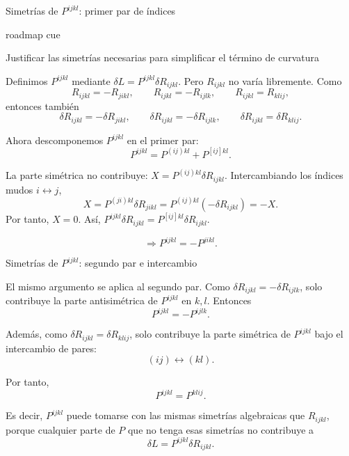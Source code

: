 \documentclass{beamer}
\newcommand{\DenseDisplaySpacing}{%
\setlength{\abovedisplayskip}{1pt}%
\setlength{\belowdisplayskip}{1pt}%
\setlength{\abovedisplayshortskip}{0pt}%
\setlength{\belowdisplayshortskip}{0pt}%
\setlength{\jot}{1pt}%
}
\newcommand{\RoadmapCue}[1]{%
    \begin{beamercolorbox}[
        wd=\textwidth,
        sep=.55ex,
        leftskip=.8ex,
        rounded=true
    ]{roadmap cue}

    \scriptsize
    \enspace #1

    \end{beamercolorbox}

    \vspace{.25em}
}
\begin{document}
\begin{frame}[label=nav-frame-011]{Simetrías de \(P^{ijkl}\): primer par de índices}
\RoadmapCue{
Justificar las simetrías necesarias para simplificar
el término de curvatura
}
\small
\linespread{.94}\selectfont\DenseDisplaySpacing
Definimos \(P^{ijkl}\) mediante $\delta L=P^{ijkl}\delta R_{ijkl}$. Pero \(R_{ijkl}\) no varía libremente. Como
\[
R_{ijkl}=-R_{jikl},\qquad
R_{ijkl}=-R_{ijlk},\qquad
R_{ijkl}=R_{klij},
\]
entonces también
\[
\delta R_{ijkl}=-\delta R_{jikl},\qquad
\delta R_{ijkl}=-\delta R_{ijlk},\qquad
\delta R_{ijkl}=\delta R_{klij}.
\]

Ahora descomponemos \(P^{ijkl}\) en el primer par:
\[
P^{ijkl}=P^{(ij)kl}+P^{[ij]kl}.
\]

La parte simétrica no contribuye: $X=P^{(ij)kl}\delta R_{ijkl}$. Intercambiando los índices mudos \(i\leftrightarrow j\),
\[
X=P^{(ji)kl}\delta R_{jikl}
  =P^{(ij)kl}(-\delta R_{ijkl})
  =-X.
\]
Por tanto, $X=0$. Así, $P^{ijkl}\delta R_{ijkl} = P^{[ij]kl}\delta R_{ijkl}$.

\[
\Rightarrow \boxed{P^{ijkl}=-P^{jikl}}.
\]

\end{frame}

\begin{frame}[label=nav-frame-012]{Simetrías de \(P^{ijkl}\): segundo par e intercambio}

El mismo argumento se aplica al segundo par. Como $\delta R_{ijkl}=-\delta R_{ijlk}$, solo contribuye la parte antisimétrica de \(P^{ijkl}\) en \(k,l\). Entonces
\[
\boxed{P^{ijkl}=-P^{ijlk}}.
\]

Además, como $\delta R_{ijkl}=\delta R_{klij}$, solo contribuye la parte simétrica de \(P^{ijkl}\) bajo el intercambio de pares:
\[
(ij)\leftrightarrow(kl).
\]

Por tanto,
\[
\boxed{P^{ijkl}=P^{klij}}.
\]

Es decir, \(P^{ijkl}\) puede tomarse con las mismas simetrías algebraicas que \(R_{ijkl}\), porque cualquier parte de \(P\) que no tenga esas simetrías no contribuye a
\[
\delta L=P^{ijkl}\delta R_{ijkl}.
\]

\end{frame}
\end{document}
